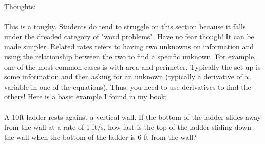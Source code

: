 \documentclass[10pt]{article}
\theoremstyle{Theorem}
\theoremstyle{definition}
\theoremstyle{remark}
\theoremstyle{custom}
\begin{document}
\thispagestyle{firststyle}
\pagestyle{plain}

Thoughts:\\\\
This is a toughy. Students do tend to struggle on this section because it falls under the dreaded category of "word problems". Have no fear though! It can be made simpler. Related rates refers to having two unknowns on information and using the relationship between the two to find a specific unknown. For example, one of the most common cases is with area and perimeter. Typically the set-up is some information and then asking for an unknown (typically a derivative of a variable in one of the equations). Thus, you need to use derivatives to find the others! Here is a basic example I found in my book:\\\\
A 10ft ladder rests against a vertical wall. If the bottom of the ladder slides away from the wall at a rate of 1 ft/s, how fast is the top of the ladder sliding down the wall when the bottom of the ladder is 6 ft from the wall?\\\\
\end{document}
